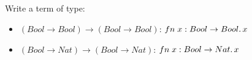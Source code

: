 \subsection{}

Write a term of type:
\begin{itemize}
	\item $(Bool \to Bool) \to (Bool \to Bool)$: $fn\;x: Bool \to Bool.\,x$
	\item $(Bool \to Nat) \to (Bool \to Nat)$: $fn\;x: Bool \to Nat.\,x$
\end{itemize}


